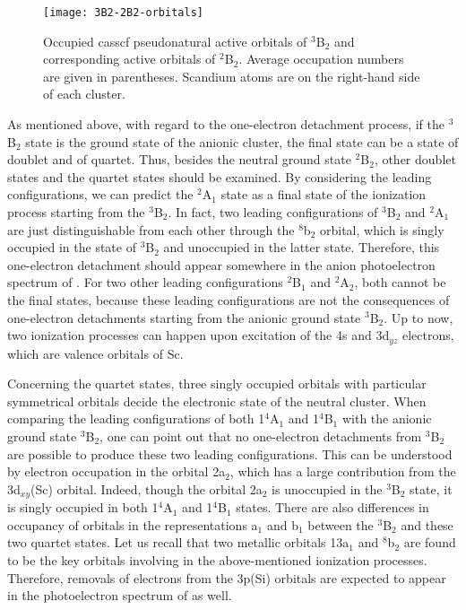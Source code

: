 \begin{refsection}
\begin{figure}[htb!]
	\centering
	\texttt{[image: 3B2-2B2-orbitals]}
	\caption{Occupied \acrshort{casscf} pseudonatural active orbitals of $^3$B$_2$ and corresponding active orbitals of $^2$B$_2$. Average occupation numbers are given in parentheses. Scandium atoms are on the right-hand side of each cluster.}
	\label{fig3:orbs}
\end{figure}



As mentioned above, with regard to the one-electron detachment process, if the $^3$B$_2$ state is the ground state of the anionic cluster, the final state can be a state of doublet and of quartet. Thus, besides the neutral ground state $^2$B$_2$, other doublet states and the quartet states should be examined. By considering the leading configurations, we can predict the $^2$A$_1$ state as a final state of the ionization process starting from the $^3$B$_2$. In fact, two leading configurations of $^3$B$_2$ and $^2$A$_1$ are just distinguishable from each other through the $^8$b$_2$ orbital, which is singly occupied in the state of $^3$B$_2$ and unoccupied in the latter state. Therefore, this one-electron detachment should appear somewhere in the anion photoelectron spectrum of . For two other leading configurations $^2$B$_1$ and $^2$A$_2$, both cannot be the final states, because these leading configurations are not the consequences of one-electron detachments starting from the anionic ground state $^3$B$_2$. Up to now, two ionization processes can happen upon excitation of the 4s and 3d$_{yz}$ electrons, which are valence orbitals of Sc.  



Concerning the quartet states, three singly occupied orbitals with particular symmetrical orbitals decide the electronic state of the neutral cluster. When comparing the leading configurations of both 1$^4$A$_1$ and 1$^4$B$_1$ with the anionic ground state $^3$B$_2$, one can point out that no one-electron detachments from $^3$B$_2$ are possible to produce these two leading configurations. This can be understood by electron occupation in the orbital 2a$_2$, which has a large contribution from the 3d$_{xy}$(Sc) orbital. Indeed, though the orbital 2a$_2$ is unoccupied in the $^3$B$_2$ state, it is singly occupied in both 1$^4$A$_1$ and 1$^4$B$_1$ states. There are also differences in occupancy of orbitals in the representations a$_1$ and b$_1$ between the $^3$B$_2$ and these two quartet states. Let us recall that two metallic orbitals 13a$_1$ and $^8$b$_2$ are found to be the key orbitals involving in the above-mentioned ionization processes. Therefore, removals of electrons from the 3p(Si) orbitals are expected to appear in the photoelectron spectrum of  as well. 




\end{refsection}
